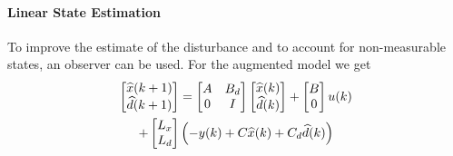\paragraph{Linear State Estimation}
To improve the estimate of the disturbance and to account for non-measurable states, an observer can be used. For the augmented model we get
    {\small
        \begin{gather*}
            \begin{bmatrix}
                \widehat{x}(k + 1) \\
                \widehat{d}(k + 1)
            \end{bmatrix}=
            \begin{bmatrix}
                A & B_d \\
                0 & I
            \end{bmatrix}
            \begin{bmatrix}
                \widehat{x}(k) \\
                \widehat{d}(k)
            \end{bmatrix}
            +\begin{bmatrix}
                B \\
                0
            \end{bmatrix}
            u(k)
            \\
            +\begin{bmatrix}
                L_x \\
                L_d
            \end{bmatrix}
            \Bigl(-y(k) + C\widehat{x}(k) + C_d \widehat{d}(k)\Bigr)
        \end{gather*}
    }

